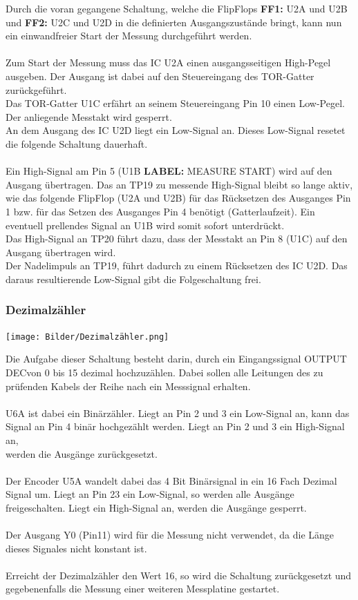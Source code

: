 Durch die voran gegangene Schaltung, welche die FlipFlops \textbf{FF1:} U2A und U2B und \textbf{FF2:} U2C und U2D in die definierten Ausgangszustände bringt, kann nun ein einwandfreier Start der Messung durchgeführt werden. 
\\
\\
Zum Start der Messung muss das IC U2A einen ausgangsseitigen High-Pegel ausgeben. Der Ausgang ist dabei auf den Steuereingang des TOR-Gatter zurückgeführt.
\\
Das TOR-Gatter U1C erfährt an seinem Steuereingang Pin 10 einen Low-Pegel. Der anliegende Messtakt wird gesperrt.
\\
An dem Ausgang des IC U2D liegt ein Low-Signal an. Dieses Low-Signal resetet die folgende Schaltung dauerhaft.  
\\
\\
Ein High-Signal am Pin 5 (U1B \textbf{LABEL:} MEASURE START) wird auf den Ausgang übertragen. Das an TP19 zu messende High-Signal bleibt so lange aktiv, wie das folgende FlipFlop (U2A und U2B) für das Rücksetzen des Ausganges Pin 1 bzw. für das Setzen des Ausganges Pin 4 benötigt (Gatterlaufzeit). Ein eventuell prellendes Signal an U1B wird somit sofort unterdrückt.
\\
Das High-Signal an TP20 führt dazu, dass der Messtakt an Pin 8 (U1C) auf den Ausgang übertragen wird. 
\\ 
Der Nadelimpuls an TP19, führt dadurch zu einem Rücksetzen des IC U2D. Das daraus resultierende Low-Signal gibt die Folgeschaltung frei.

\newpage
\subsubsection{Dezimalzähler}

\begin{center}
\texttt{[image: Bilder/Dezimalzähler.png]}
\end{center}

Die Aufgabe dieser Schaltung besteht darin, durch ein Eingangssignal \glqq OUTPUT DEC\grqq  von 0 bis 15 dezimal hochzuzählen. Dabei sollen alle Leitungen des zu prüfenden Kabels der Reihe nach ein Messsignal erhalten.
\\
\\
U6A ist dabei ein Binärzähler. Liegt an Pin 2 und 3 ein Low-Signal an, kann das Signal an Pin 4 binär hochgezählt werden. Liegt an Pin 2 und 3 ein High-Signal an,\\ werden die Ausgänge zurückgesetzt.
\\
\\
Der Encoder U5A wandelt dabei das 4 Bit Binärsignal in ein 16 Fach Dezimal Signal um. Liegt an Pin 23 ein Low-Signal, so werden alle Ausgänge freigeschalten. Liegt ein High-Signal an, werden die Ausgänge gesperrt.
\\
\\
Der Ausgang Y0 (Pin11) wird für die Messung nicht verwendet, da die Länge dieses Signales nicht konstant ist. 
\\
\\
Erreicht der Dezimalzähler den Wert 16, so wird die Schaltung zurückgesetzt und gegebenenfalls die Messung einer weiteren Messplatine gestartet.


